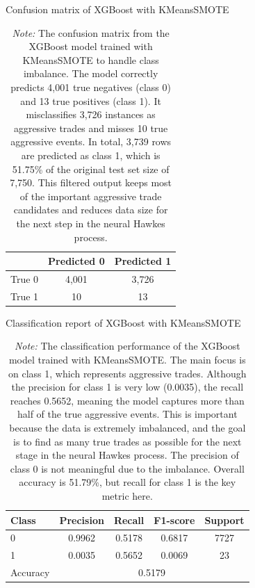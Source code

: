 \begin{table}[htbp]
    \centering
    \caption{Confusion matrix of XGBoost with KMeansSMOTE}
    \caption*{\textit{Note:} The confusion matrix from the XGBoost model trained with KMeansSMOTE to handle class imbalance. The model correctly predicts 4,001 true negatives (class 0) and 13 true positives (class 1). It misclassifies 3,726 instances as aggressive trades and misses 10 true aggressive events. In total, 3,739 rows are predicted as class 1, which is 51.75\% of the original test set size of 7,750. This filtered output keeps most of the important aggressive trade candidates and reduces data size for the next step in the neural Hawkes process.}
    \label{tab:xgb-confusion-km}
    \begin{tabular}{lcc}
        \toprule
        & Predicted 0 & Predicted 1 \\
        \midrule
        True 0 & 4,001 & 3,726 \\
        True 1 & 10 & 13 \\
        \bottomrule
    \end{tabular}
\end{table}

\begin{table}[htbp]
    \centering
    \caption{Classification report of XGBoost with KMeansSMOTE}
    \caption*{\textit{Note:} The classification performance of the XGBoost model trained with KMeansSMOTE. The main focus is on class 1, which represents aggressive trades. Although the precision for class 1 is very low (0.0035), the recall reaches 0.5652, meaning the model captures more than half of the true aggressive events. This is important because the data is extremely imbalanced, and the goal is to find as many true trades as possible for the next stage in the neural Hawkes process. The precision of class 0 is not meaningful due to the imbalance. Overall accuracy is 51.79\%, but recall for class 1 is the key metric here.}

    \label{tab:xgb-classification-report-km}
    \begin{tabular}{lcccc}
        \toprule
        Class & Precision & Recall & F1-score & Support \\
        \midrule
        0 & 0.9962 & 0.5178 & 0.6817 & 7727 \\
        1 & 0.0035 & 0.5652 & 0.0069 & 23 \\
        \midrule
        Accuracy & \multicolumn{4}{c}{0.5179} \\
        \bottomrule
    \end{tabular}
\end{table}

